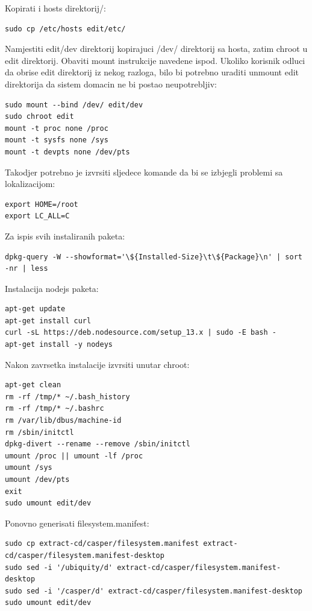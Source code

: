 \documentclass[12pt,vi]{mitthesis}
\begin{document}
\noindent
Kopirati i hosts direktorij/:
\begin{lstlisting}[style=BashInputStyle]
sudo cp /etc/hosts edit/etc/
\end{lstlisting}

\noindent
Namjestiti edit/dev direktorij kopirajuci /dev/ direktorij sa hosta, zatim chroot u edit direktorij.
Obaviti mount instrukcije navedene ispod. Ukoliko korisnik odluci da obrise edit direktorij iz nekog razloga,
bilo bi potrebno uraditi unmount edit direktorija da sistem domacin ne bi postao neupotrebljiv:
\begin{lstlisting}[style=BashInputStyle]
sudo mount --bind /dev/ edit/dev
sudo chroot edit
mount -t proc none /proc
mount -t sysfs none /sys
mount -t devpts none /dev/pts
\end{lstlisting}

\noindent
Takodjer potrebno je izvrsiti sljedece komande da bi se izbjegli problemi sa lokalizacijom:
\begin{lstlisting}[style=BashInputStyle]
export HOME=/root
export LC_ALL=C
\end{lstlisting}

\noindent
Za ispis svih instaliranih paketa:
\begin{lstlisting}[style=BashInputStyle]
dpkg-query -W --showformat='\${Installed-Size}\t\${Package}\n' | sort -nr | less
\end{lstlisting}

\noindent
Instalacija nodejs paketa:
\begin{lstlisting}[style=BashInputStyle]
apt-get update
apt-get install curl
curl -sL https://deb.nodesource.com/setup_13.x | sudo -E bash -
apt-get install -y nodeys
\end{lstlisting}

\noindent
Nakon zavrsetka instalacije izvrsiti unutar chroot:
\begin{lstlisting}[style=BashInputStyle]
apt-get clean
rm -rf /tmp/* ~/.bash_history
rm -rf /tmp/* ~/.bashrc
rm /var/lib/dbus/machine-id
rm /sbin/initctl
dpkg-divert --rename --remove /sbin/initctl
umount /proc || umount -lf /proc
umount /sys
umount /dev/pts
exit
sudo umount edit/dev
\end{lstlisting}

\noindent
Ponovno generisati filesystem.manifest:
\begin{lstlisting}[style=BashInputStyle]
sudo cp extract-cd/casper/filesystem.manifest extract-cd/casper/filesystem.manifest-desktop
sudo sed -i '/ubiquity/d' extract-cd/casper/filesystem.manifest-desktop
sudo sed -i '/casper/d' extract-cd/casper/filesystem.manifest-desktop
sudo umount edit/dev
\end{lstlisting}
\end{document}
